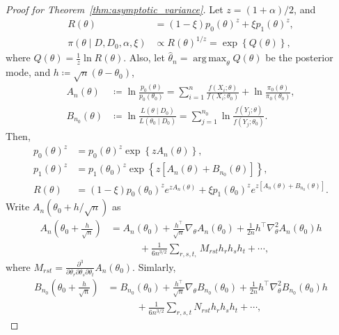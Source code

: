 \documentclass[12pt]{article}
\DeclareMathOperator*{\argmax}{arg\,max}
\begin{document}
\begin{proof}[Proof for Theorem~\ref{thm:asymptotic_variance}]
    Let $z = (1 + \alpha) / 2$, and
    \begin{align*}
        R(\theta) &= (1 - \xi) p_0(\theta)^z + \xi p_1(\theta)^z, \\
        \pi(\theta \mid D, D_0, \alpha, \xi) &\propto R(\theta)^{1/z} = \exp\left\{Q(\theta)\right\},
    \end{align*}
    where $Q(\theta) = \frac{1}{z}\ln R(\theta)$.
    Also, let $\hat{\theta}_n = \argmax_\theta Q(\theta)$ be the posterior mode, and $h \coloneqq \sqrt{n}(\theta - \theta_0)$,
    \begin{align*}
        A_n(\theta) &\coloneqq \ln\frac{p_0(\theta)}{p_0(\theta_0)} = \sum^n_{i=1}\frac{f(X_i; \theta)}{f(X_i; \theta_0)} + \ln\frac{\pi_0(\theta)}{\pi_0(\theta_0)}, \\
        B_{n_0}(\theta) &\coloneqq \ln\frac{L(\theta \mid D_0)}{L(\theta_0 \mid D_0)} = \sum^{n_0}_{j=1}\ln\frac{f(Y_j; \theta)}{f(Y_j; \theta_0)}.
    \end{align*}
    Then,
    \begin{align*}
        p_0(\theta)^z &= p_0(\theta)^z\exp\left\{z A_n(\theta)\right\}, \\
        p_1(\theta)^z &= p_1(\theta_0)^z\exp\left\{z\left[A_n(\theta) + B_{n_0}(\theta)\right]\right\}, \\
        R(\theta) &= (1 - \xi) p_0(\theta_0)^z e^{z A_n(\theta)} + \xi p_1(\theta_0)^z e^{z[A_n(\theta) + B_{n_0}(\theta)]}.
    \end{align*}
    Write $A_n(\theta_0 + h / \sqrt{n})$ as
    \begin{align*}
        A_n\left(\theta_0 + \frac{h}{\sqrt{n}}\right) &= A_n(\theta_0) + \frac{h^\top}{\sqrt{n}}\nabla_\theta A_n(\theta_0) + \frac{1}{2n}h^\top\nabla_\theta^2A_n(\theta_0)h \\
        &\quad\quad\quad + \frac{1}{6n^{3/2}}\sum_{r,s,t,}M_{rst}h_rh_sh_t + \cdots,
    \end{align*}
    where $M_{rst} = \frac{\partial^3}{\partial\theta_r\partial\theta_s\partial\theta_t}A_n(\theta_0)$.
    Simlarly,
    \begin{align*}
        B_{n_0}\left(\theta_0 + \frac{h}{\sqrt{n}}\right) &= B_{n_0}(\theta_0) + \frac{h^\top}{\sqrt{n}}\nabla_\theta B_{n_0}(\theta_0) + \frac{1}{2n}h^\top \nabla_\theta^2 B_{n_0}(\theta_0)h \\
        &\quad\quad\quad + \frac{1}{6n^{3/2}}\sum_{r,s,t}N_{rst}h_rh_sh_t + \cdots,
    \end{align*}

\end{proof}
\end{document}
